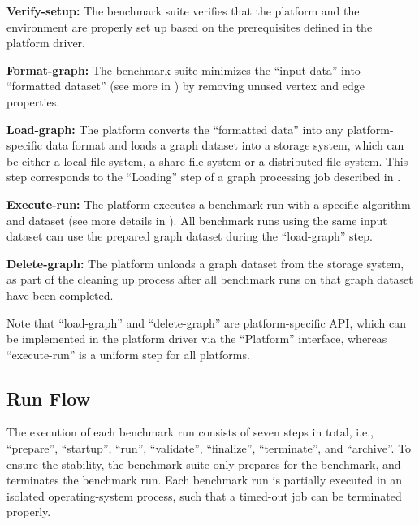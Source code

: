 \begin{enumerate}[label=\textbf{[\Alph*]}]
    \item \textbf{Verify-setup:} The benchmark suite verifies that the platform and the environment are properly set up based on the prerequisites defined in the platform driver.
    
    \item \textbf{Format-graph:} The benchmark suite minimizes the ``input data'' into ``formatted dataset'' (see more in ) by removing unused vertex and edge properties.
    
    \item \textbf{Load-graph:} The platform converts the ``formatted data'' into any platform-specific data format and loads a graph dataset into a storage system, which can be either a local file system, a share file system or a distributed file system. This step corresponds to the ``Loading'' step of a graph processing job described in .
    
    \item \textbf{Execute-run:} The platform executes a benchmark run with a specific algorithm and dataset (see more details in ). All benchmark runs using the same input dataset can use the prepared graph dataset during the ``load-graph'' step. 
    
    \item \textbf{Delete-graph:} The platform unloads a graph dataset from the storage system, as part of the cleaning up process after all benchmark runs on that graph dataset have been completed.
\end{enumerate}

Note that ``load-graph'' and ``delete-graph'' are platform-specific API, which can be implemented in the platform driver via the ``Platform'' interface, whereas  ``execute-run'' is a uniform step for all platforms. 

\subsection{Run Flow}
\label{sec:process:execution:run_flow}
The execution of each benchmark run consists of seven steps in total, i.e., ``prepare'', ``startup'', ``run'', ``validate'', ``finalize'', ``terminate'', and  ``archive''. To ensure the stability, the benchmark suite only prepares for the benchmark, and terminates the benchmark run. Each benchmark run is partially executed in an isolated operating-system process, such that a timed-out job can be terminated properly.

